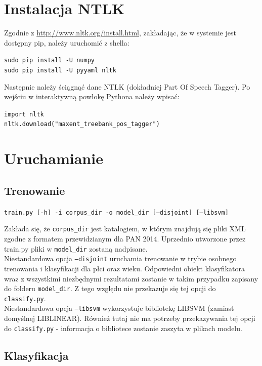 \documentclass{article}
\begin{document}
\section{Instalacja NTLK}

Zgodnie z \href{http://www.nltk.org/install.html}{http://www.nltk.org/install.html}, zakładając, że w systemie jest dostępny pip, należy uruchomić z shella:

\texttt{sudo pip install -U numpy \\
sudo pip install -U pyyaml nltk}

Następnie należy ściągnąć dane NTLK (dokładniej Part Of Speech Tagger). Po wejściu w interaktywną powłokę Pythona należy wpisać:

\texttt{import nltk \\
nltk.download("maxent\_treebank\_pos\_tagger")}


\section{Uruchamianie}

\subsection{Trenowanie}

\texttt{train.py [-h] -i corpus\_dir -o model\_dir [--disjoint] [--libsvm]}

Zakłada się, że \texttt{corpus\_dir} jest katalogiem, w którym znajdują się pliki XML zgodne z formatem przewidzianym dla PAN 2014. Uprzednio utworzone przez train.py pliki w \texttt{model\_dir} zostaną nadpisane. \\
Niestandardowa opcja \texttt{--disjoint} uruchamia trenowanie w trybie osobnego trenowania i klasyfikacji dla płci oraz wieku. Odpowiedni obiekt klasyfikatora wraz z wszystkimi niezbędnymi rezultatami zostanie w takim przypadku zapisany do folderu \texttt{model\_dir}. Z tego względu nie przekazuje się tej opcji do \texttt{classify.py}. \\
Niestandardowa opcja \texttt{--libsvm} wykorzystuje bibliotekę LIBSVM (zamiast domyślnej LIBLINEAR). Również tutaj nie ma potrzeby przekazywania tej opcji do \texttt{classify.py} - informacja o bibliotece zostanie zaszyta w plikach modelu.

\subsection{Klasyfikacja}
\end{document}

